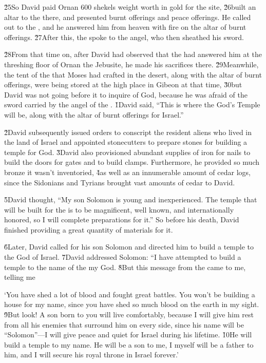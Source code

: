 \v{25}So David paid Ornan 600 shekels weight worth in gold for the site, \v{26}built an altar to the  there, and presented burnt offerings and peace offerings. He called out to the , and he answered him from heaven with fire on the altar of burnt offerings. \v{27}After this, the  spoke to the angel, who then sheathed his sword.

\v{28}From that time on, after David had observed that the  had answered him at the threshing floor of Ornan the Jebusite, he made his sacrifices there. \v{29}Meanwhile, the tent of the  that Moses had crafted in the desert, along with the altar of burnt offerings, were being stored at the high place in Gibeon at that time, \v{30}but David was not going before it to inquire of God, because he was afraid of the sword carried by the angel of the .
\v{1}David said, ``This is where the  God's Temple will be, along with the altar of burnt offerings for Israel.''

\v{2}David subsequently issued orders to conscript the resident aliens who lived in the land of Israel and appointed stonecutters to prepare stones for building a temple for God. \v{3}David also provisioned abundant supplies of iron for nails to build the doors for gates and to build clamps. Furthermore, he provided so much bronze it wasn't inventoried, \v{4}as well as an innumerable amount of cedar logs, since the Sidonians and Tyrians brought vast amounts of cedar to David.

\v{5}David thought, ``My son Solomon is young and inexperienced. The temple that will be built for the  is to be magnificent, well known, and internationally honored, so I will complete preparations for it.'' So before his death, David finished providing a great quantity of materials for it.

\v{6}Later, David called for his son Solomon and directed him to build a temple to the  God of Israel. \v{7}David addressed Solomon: ``I have attempted to build a temple to the name of the  my God. \v{8}But this message from the  came to me, telling me

\begin{poetry}
\poeml `You have shed a lot of blood and fought great battles. You won't be building a house for my name, since you have shed so much blood on the earth in my sight. \v{9}But look! A son born to you will live comfortably, because I will give him rest from all his enemies that surround him on every side, since his name will be ``Solomon''---I will give peace and quiet for Israel during his lifetime. \v{10}He will build a temple to my name. He will be a son to me, I myself will be a father to him, and I will secure his royal throne in Israel forever.'
\end{poetry}

